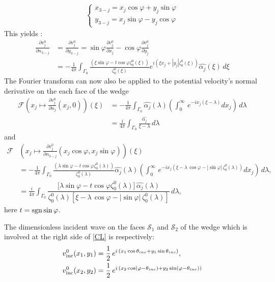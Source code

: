 \begin{eqnarray}
\label{changecoords}
\left\{
\begin{array}{l}
x_{3-j}=x_j\cos\varphi+y_j\sin\varphi \\
y_{3-j}=x_j\sin\varphi-y_j\cos\varphi
\end{array}
\right.
\end{eqnarray}
This yields :
\begin{align}
\frac{\partial v_j^0}{\partial n_{3-j}}&=\frac{\partial v_j^0}{\partial y_{3-j}}= \sin\varphi \frac{\partial v_j^0}{\partial x_j}-\cos\varphi \frac{\partial v_j^0}{\partial y_j}\\
&=-\frac{1}{4\pi}\int_{\Gamma_0}\frac{(\xi\sin\varphi-t\cos\varphi\zeta_0^0(\xi))}{\zeta_0^0(\xi)}e^{i(\xi x_j+|y_j|\zeta_0^0(\xi))}\hat{\alpha_j}(\xi)\,d\xi
\end{align}
The Fourier transform can now also be applied to the potential velocity's normal derivative on the each face of the wedge
\begin{align}
\mathcal{F}(x_j \mapsto \frac{\partial v_j^0}{\partial n_j} (x_j,0))(\xi)&=-\frac{1}{4\pi} \int_{\Gamma_0}  \hat{\alpha_j}(\lambda)\left( \int_0^{\infty} \, e^{-i x_j (\xi-\lambda)} dx_j \right)\, d \lambda \nonumber\\
&=\frac{i}{4\pi}\int_{\Gamma_0}\frac{\hat{\alpha_j}}{\xi-\lambda}\, d\lambda
\end{align}
and
\begin{align}
\mathcal{F} &\left( x_j \mapsto \frac{\partial v_j^0}{\partial n_{3-j}} ( x_j \cos \varphi,x_j \sin \varphi) \right)(\xi)  \nonumber\\
& =  -\frac{1}{4\pi} \int_{\Gamma_0}  \frac{(\lambda\sin\varphi-t\cos\varphi\zeta_0^0(\lambda))}{\zeta_0^0(\lambda)}\hat{\alpha_j}(\lambda)  \left( \int_0^{\infty} \, e^{-i x_j \left( \xi - \lambda  \, \cos \varphi - |\sin \varphi| \, \zeta_0^0(\lambda) \right)} dx_j \right) \,d \lambda, \nonumber\\
& = \frac{i}{4\pi} \int_{\Gamma_0} \dfrac{ \lbrack \lambda\sin\varphi-t\cos\varphi\zeta_0^0(\lambda)\rbrack \, \hat{\alpha_j}(\lambda)}{\zeta_0^0(\lambda) \left[ \xi - \lambda \, \cos \varphi  - |\sin \varphi| \, \zeta_0^0(\lambda) \right]} \, d\lambda,
\end{align}
here $t=\rm sgn \sin \varphi$.

The dimensionless incident wave on the faces $\mathcal{S}_1$ and $\mathcal{S}_2$ of the wedge which is involved at the right side of \eqref{CL} is respectively:
\begin{subequations}
\label{CL2}
\begin{align}
v^0_{\rm inc}(x_1,y_1) & =  \dfrac{1}{2} \, e^{i \, (x_1 \cos \theta_{inc}+y_1\sin\theta_{inc} ) } ,\\
v^0_{\rm inc}(x_2,y_2) & =   \dfrac{1}{2} \, e^{i \, (x_2 \cos (\varphi - \theta_{inc} )+y_2\sin(\varphi-\theta_{inc}))} 
\end{align}
\end{subequations}

